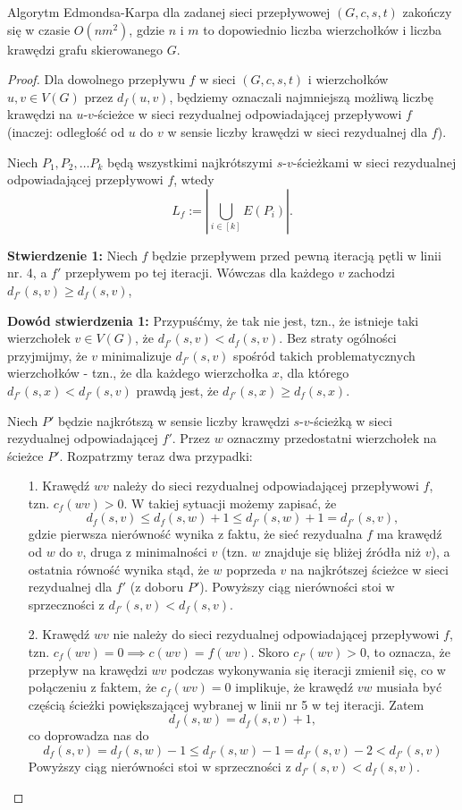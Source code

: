 \begin{theorem}
	Algorytm Edmondsa-Karpa dla zadanej sieci przepływowej $(G, c, s, t)$
	zakończy się w czasie $O(nm^2)$, gdzie $n$ i $m$ to dopowiednio
	liczba wierzchołków i liczba krawędzi grafu skierowanego $G$.
	\begin{proof}
		Dla dowolnego przepływu $f$ w sieci $(G, c, s, t)$ i wierzchołków
		$u, v \in V(G)$ przez $d_f(u, v)$, będziemy oznaczali najmniejszą
		możliwą liczbę krawędzi na $u$-$v$-ścieżce w sieci 
		rezydualnej odpowiadającej przepływowi $f$ (inaczej: odległość
		od $u$ do $v$ w sensie liczby krawędzi w sieci rezydualnej dla $f$).
		
		Niech $P_1, P_2, \dots P_k$ będą wszystkimi najkrótszymi
		$s$-$v$-ścieżkami w sieci rezydualnej odpowiadającej przepływowi
		$f$, wtedy 
		\[L_f := \left|\bigcup_{i \in [k]} E(P_i)\right|.\]
		
		\textbf{Stwierdzenie 1:} Niech $f$ będzie przepływem przed
		pewną iteracją pętli w linii nr. 4, a $f'$ przepływem 
		po tej iteracji. Wówczas
		dla każdego $v$ zachodzi $d_{f'}(s, v) \geq d_{f}(s,v)$,
		
		\textbf{Dowód stwierdzenia 1:}
		Przypuśćmy, że tak nie jest, tzn., że istnieje 
		taki wierzchołek $v \in V(G)$, że $d_{f'}(s, v) < d_f(s,v)$.
		Bez straty ogólności przyjmijmy, że $v$
		minimalizuje $d_{f'}(s,v)$ spośród takich problematycznych 
		wierzchołków - tzn., że dla każdego wierzchołka $x$, dla 
		którego $d_{f'}(s, x) < d_{f'}(s, v)$ prawdą jest, że 
		$d_{f'}(s, x) \geq d_f(s,x)$.
		
		Niech $P'$ będzie najkrótszą w sensie liczby krawędzi $s$-$v$-ścieżką
		w sieci rezydualnej odpowiadającej $f'$. Przez $w$ oznaczmy 
		przedostatni wierzchołek na ścieżce $P'$. Rozpatrzmy
		teraz dwa przypadki:
		\begin{itemize}
			\item[1.] Krawędź $wv$ należy do sieci rezydualnej 
			odpowiadającej
			przepływowi $f$, tzn. $c_f(wv) > 0$. W takiej 
			sytuacji możemy zapisać, że  
			\[d_f(s, v) \leq d_f(s, w) + 1 \leq d_{f'}(s, w) + 1 = d_{f'}(s, v),\]
			gdzie pierwsza nierówność wynika z faktu, że sieć rezydualna $f$
			ma krawędź od $w$ do $v$, druga z minimalności $v$ (tzn. 
			$w$ znajduje się bliżej źródła niż $v$), a ostatnia równość
			wynika stąd, że $w$ poprzeda $v$ na najkrótszej ścieżce 
			w sieci rezydualnej dla $f'$ (z doboru $P'$).
			Powyższy ciąg nierówności stoi w sprzeczności z
			$d_{f'}(s, v) < d_f(s,v)$.
			
			\item[2.] Krawędź $wv$ nie należy do sieci rezydualnej 
			odpowiadającej
			przepływowi $f$, tzn. $c_f(wv) = 0 \implies c(wv) = f(wv)$.
			Skoro  $c_{f'}(wv) > 0$, to oznacza, że przepływ na
			krawędzi $wv$ podczas wykonywania się iteracji zmienił się, 
			co w połączeniu z faktem, że  $c_f(wv) = 0$
			implikuje, że krawędź $vw$ musiała być częścią ścieżki 
			powiększającej wybranej w linii nr 5 w tej iteracji.
			Zatem 
			\[d_f(s, w) = d_f(s, v) + 1,\]
			co doprowadza nas do 
			\[d_f(s, v) = d_f(s,w) - 1 \leq
			d_{f'}(s,w) -1 = d_{f'}(s,v    ) - 2 < d_{f'}(s,v)\]
			Powyższy ciąg nierówności stoi w sprzeczności z
			$d_{f'}(s, v) < d_f(s,v)$.
		\end{itemize}
		

\end{proof}
\end{theorem}
